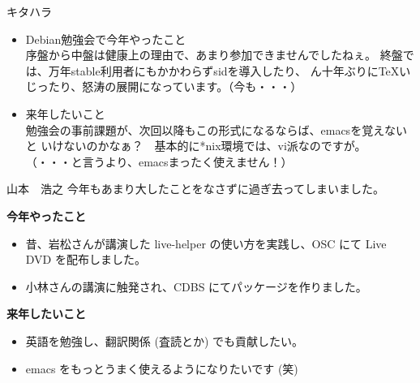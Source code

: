 \begin{prework}{キタハラ}
\begin{itemize}
\item Debian勉強会で今年やったこと\\
序盤から中盤は健康上の理由で、あまり参加できませんでしたねぇ。
終盤では、万年stable利用者にもかかわらずsidを導入したり、
ん十年ぶりにTeXいじったり、怒涛の展開になっています。（今も・・・）

\item  来年したいこと\\
勉強会の事前課題が、次回以降もこの形式になるならば、emacsを覚えないと
いけないのかなぁ？　基本的に*nix環境では、vi派なのですが。
（・・・と言うより、emacsまったく使えません！）
\end{itemize}

\end{prework}
\begin{prework}{山本　浩之}
今年もあまり大したことをなさずに過ぎ去ってしまいました。

\textbf{今年やったこと}
\begin{itemize}
\item 昔、岩松さんが講演した live-helper の使い方を実践し、OSC にて Live
      DVD を配布しました。
\item 小林さんの講演に触発され、CDBS にてパッケージを作りました。
\end{itemize}

\textbf{来年したいこと}
\begin{itemize}
\item 英語を勉強し、翻訳関係 (査読とか) でも貢献したい。
\item emacs をもっとうまく使えるようになりたいです (笑)
\end{itemize}

\end{prework}
